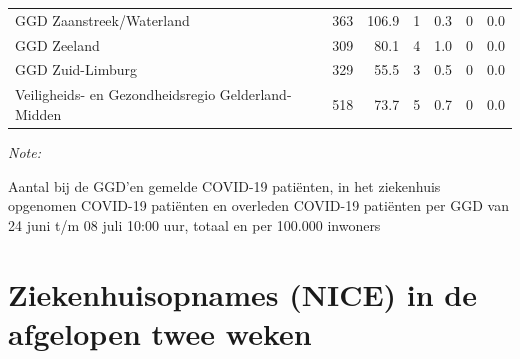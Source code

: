 \documentclass[
  english,
  man,floatsintext]{apa6}
\begin{document}
\begin{table}
\begin{threeparttable}
\begin{tabular}{lrrrrrr}
GGD Zaanstreek/Waterland & 363 & 106.9 & 1 & 0.3 & 0 & 0.0\\
GGD Zeeland & 309 & 80.1 & 4 & 1.0 & 0 & 0.0\\
GGD Zuid-Limburg & 329 & 55.5 & 3 & 0.5 & 0 & 0.0\\
Veiligheids- en Gezondheidsregio Gelderland-Midden & 518 & 73.7 & 5 & 0.7 & 0 & 0.0\\
\bottomrule
\end{tabular}
\begin{tablenotes}
\item \textit{Note: } 
\item Aantal bij de GGD’en gemelde COVID-19 patiënten, in het ziekenhuis opgenomen COVID-19 patiënten en overleden COVID-19 patiënten per GGD van 24 juni t/m 08 juli 10:00 uur, totaal en per 100.000 inwoners
\end{tablenotes}
\end{threeparttable}
\endgroup{}
\end{table}

\newpage

\hypertarget{ziekenhuisopnames-nice-in-de-afgelopen-twee-weken}{%
\section{Ziekenhuisopnames (NICE) in de afgelopen twee weken}\label{ziekenhuisopnames-nice-in-de-afgelopen-twee-weken}}
\end{document}
